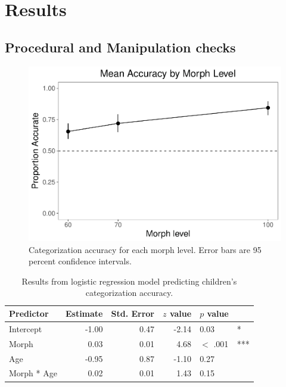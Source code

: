 \documentclass[floatsintext,man]{apa6}
\theoremstyle{definition}
\theoremstyle{definition}
\theoremstyle{definition}
\theoremstyle{remark}
\begin{document}
\section{Results}\label{results}

\subsection{Procedural and Manipulation
checks}\label{procedural-and-manipulation-checks}

\begin{figure}
\centering
\includegraphics{soc_ref_category_paper_files/figure-latex/morphaccuracy-1.pdf}
\caption{\label{fig:morphaccuracy}Categorization accuracy for each morph
level. Error bars are 95 percent confidence intervals.}
\end{figure}

\begin{table}[ht]
\centering
\caption{Results from logistic regression model predicting children's categorization accuracy.} 
\begin{tabular}{lrrrll}
  \hline
Predictor & Estimate & Std. Error & $z$ value & $p$ value &   \\ 
  \hline
Intercept & -1.00 & 0.47 & -2.14 & 0.03 & * \\ 
  Morph & 0.03 & 0.01 & 4.68 & $<$ .001 & *** \\ 
  Age & -0.95 & 0.87 & -1.10 & 0.27 &  \\ 
  Morph * Age & 0.02 & 0.01 & 1.43 & 0.15 &  \\ 
   \hline
\end{tabular}
\end{table}
\end{document}
